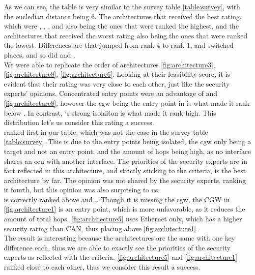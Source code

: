 As we can see, the table is very similar to the survey table \ref{table:survey}, with the eucledian distance being 6.
The architectures that received the best rating, which were 
, , , and  
also being the ones that were ranked the highest,
and the architectures that received the worst rating also being the ones that were ranked the lowest.
Differences are that  jumped from rank 4 to rank 1,  and  switched places, 
and so did  and .\\

We were able to replicate the order of architectures \ref{fig:architecture3}, \ref{fig:architecture8}, \ref{fig:architecture6}.
Looking at their feasibility score, it is evident that their rating was very close to each other, just like the security experts' opinions.
Concentrated entry points were an advantage of  and \ref{fig:architecture8}, 
however the \gls{cgw} being the entry point in  is what made it rank below .
In contrast, 's strong isolaiton is what made it rank high.
This distribution let's us consider this rating a success.\\

 ranked first in our table, which was not the case in the survey table \ref{table:survey}.
This is due to the entry points being isolated, the \gls{cgw} only being a target and not an entry point, 
and the amount of hops being high, as no interface shares an \gls{ecu} with another interface.
The priorities of the security experts are in fact reflected in this architecture, and
strictly sticking to the criteria,  is the best architecture by far.
The opinion was not shared by the security experts, ranking it fourth, but this opinion was also surprising to us.\\

 is correctly ranked above  and ..
Though it is missing the \gls{cgw}, the CGW in \ref{fig:architecture1} is an entry point, which is more unfavorable, as it reduces the amount of total hops.
\ref{fig:architecture5} uses Ethernet only, which has a higher security rating than CAN, thus placing above \ref{fig:architecture1}.\\
The result is interesting because the architectures are the same with one key difference each, thus we are able to exactly see the priorities of the security experts
as reflected with the criteria.
\ref{fig:architecture5} and \ref{fig:architecture1} ranked close to each other, thus we consider this result a success.\\

